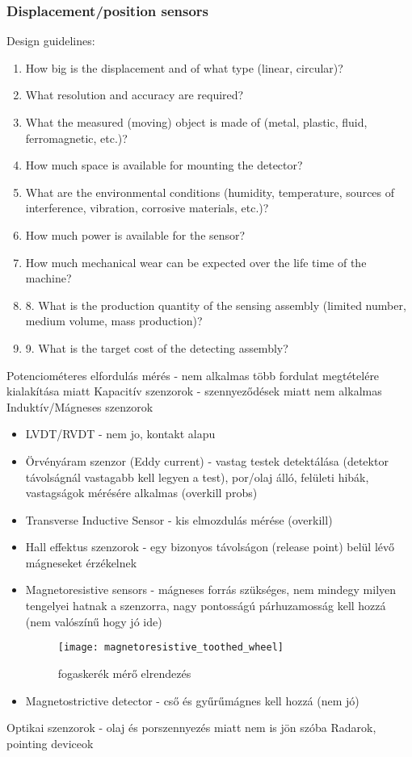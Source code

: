 \documentclass{article}
\begin{document}
	\subsubsection{Displacement/position sensors}
	Design guidelines:
	\begin{enumerate}
		\item How big is the displacement and of what type (linear, circular)?
		\item What resolution and accuracy are required?
		\item What the measured (moving) object is made of (metal, plastic, fluid, ferromagnetic, etc.)?
		\item How much space is available for mounting the detector?
		\item What are the environmental conditions (humidity, temperature, sources of
		interference, vibration, corrosive materials, etc.)?
		\item How much power is available for the sensor?
		\item How much mechanical wear can be expected over the life time of the machine?
		\item 8. What is the production quantity of the sensing assembly (limited number,
		medium volume, mass production)?
		\item 9. What is the target cost of the detecting assembly?
	\end{enumerate}
	
	Potenciométeres elfordulás mérés - nem alkalmas több fordulat megtételére kialakítása miatt
	Kapacitív szenzorok - szennyeződések miatt nem alkalmas
	Induktív/Mágneses szenzorok
	\begin{itemize}
		\item LVDT/RVDT - nem jo, kontakt alapu
		\item Örvényáram szenzor (Eddy current) - vastag testek detektálása (detektor távolságnál vastagabb kell legyen a test), por/olaj álló, felületi hibák, vastagságok mérésére alkalmas (overkill probs)
		\item Transverse Inductive Sensor - kis elmozdulás mérése (overkill)
		\item Hall effektus szenzorok - egy bizonyos távolságon (release point) belül lévő mágneseket érzékelnek
		\item Magnetoresistive sensors - mágneses forrás szükséges, nem mindegy milyen tengelyei hatnak a szenzorra, nagy pontosságú párhuzamosság kell hozzá (nem valószínű hogy jó ide)
		\begin{figure}[h]
			\caption{fogaskerék mérő elrendezés}
			\centering
			\texttt{[image: magnetoresistive\_toothed\_wheel]}
		\end{figure}
		\item Magnetostrictive detector - cső és gyűrűmágnes kell hozzá (nem jó)
	\end{itemize}
	Optikai szenzorok - olaj és porszennyezés miatt nem is jön szóba
	Radarok, pointing deviceok
	
\end{document}

